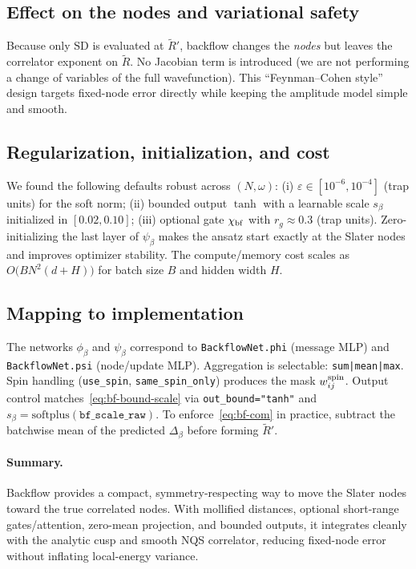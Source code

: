 \subsection{Effect on the nodes and variational safety}
Because only $\mathrm{SD}$ is evaluated at $\tilde R'$, backflow changes the \emph{nodes} but leaves the correlator exponent on $\tilde R$. No Jacobian term is introduced (we are not performing a change of variables of the full wavefunction).
This ``Feynman--Cohen style'' design targets fixed-node error directly while keeping the amplitude model simple and smooth.

\subsection{Regularization, initialization, and cost}
We found the following defaults robust across $(N,\omega)$:
(i) $\varepsilon\in[10^{-6},10^{-4}]$ (trap units) for the soft norm;
(ii) bounded output $\tanh$ with a learnable scale $s_\beta$ initialized in $[0.02,0.10]$;
(iii) optional gate $\chi_{\rm bf}$ with $r_g\approx 0.3$ (trap units).
Zero-initializing the last layer of $\psi_\beta$ makes the ansatz start exactly at the Slater nodes and improves optimizer stability.
The compute/memory cost scales as $O\!\big(BN^2(d+H)\big)$ for batch size $B$ and hidden width $H$.

\subsection{Mapping to implementation}
The networks $\phi_\beta$ and $\psi_\beta$ correspond to \texttt{BackflowNet.phi} (message MLP) and \texttt{BackflowNet.psi} (node/update MLP).
Aggregation is selectable: \texttt{sum|mean|max}. Spin handling (\texttt{use\_spin}, \texttt{same\_spin\_only}) produces the mask $w_{ij}^{\rm spin}$.
Output control matches~\eqref{eq:bf-bound-scale} via \texttt{out\_bound="tanh"} and $s_\beta=\mathrm{softplus}(\texttt{bf\_scale\_raw})$.
To enforce~\eqref{eq:bf-com} in practice, subtract the batchwise mean of the predicted $\Delta_\beta$ before forming $\tilde R'$.

\paragraph{Summary.}
Backflow provides a compact, symmetry-respecting way to move the Slater nodes toward the true correlated nodes. With mollified distances, optional short-range gates/attention, zero-mean projection, and bounded outputs, it integrates cleanly with the analytic cusp and smooth NQS correlator, reducing fixed-node error without inflating local-energy variance.


